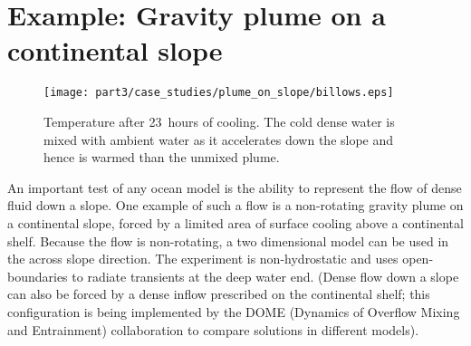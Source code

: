 \section{Example: Gravity plume on a continental slope}

\begin{figure}
\begin{center}
\texttt{[image: part3/case\_studies/plume\_on\_slope/billows.eps]}
\end{center}
\caption{Temperature after 23~hours of cooling. The cold dense water is
mixed with ambient water as it accelerates down the slope and hence
is warmed than the unmixed plume.
}
\label{fig:T-plume-on-slope}
\end{figure}

An important test of any ocean model is the ability to represent the
flow of dense fluid down a slope. One example of such a flow is a
non-rotating gravity plume on a continental slope, forced by a limited
area of surface cooling above a continental shelf. Because the flow is
non-rotating, a two dimensional model can be used in the across slope
direction. The experiment is non-hydrostatic and uses open-boundaries
to radiate transients at the deep water end.  (Dense flow down a slope
can also be forced by a dense inflow prescribed on the continental
shelf; this configuration is being implemented by the DOME (Dynamics
of Overflow Mixing and Entrainment) collaboration to compare solutions
in different models).

